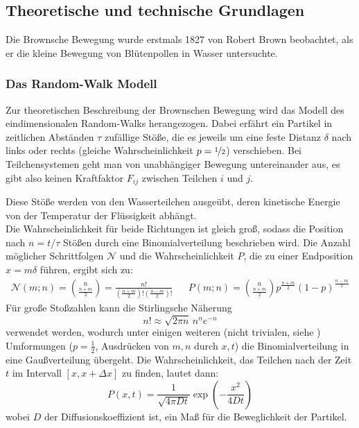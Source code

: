 \newpage

\subsection[Theoretische und technische Grundlagen]{Theoretische und technische Grundlagen \protect\autocite{Skript_2.1}}
Die Brownsche Bewegung wurde erstmals 1827 von Robert Brown beobachtet, als er die kleine Bewegung von Blütenpollen in Wasser untersuchte.

\subsubsection{Das Random-Walk Modell} \label{ssec:RndWalk}
Zur theoretischen Beschreibung der Brownschen Bewegung wird das Modell des eindimensionalen Random-Walks herangezogen. Dabei erfährt ein Partikel in zeitlichen Abständen \(\tau\) zufällige Stöße, die es jeweils um eine feste Distanz \(\delta\) nach links oder rechts (gleiche Wahrscheinlichkeit \(p=\nicefrac{1}{2}\)) verschieben. Bei Teilchensystemen geht man von unabhängiger Bewegung untereinander aus, es gibt also keinen Kraftfaktor \(F_{ij}\) zwischen Teilchen \(i\) und \(j\).

Diese Stöße werden von den Wasserteilchen ausgeübt, deren kinetische Energie von der Temperatur der Flüssigkeit abhängt. \\Die Wahrscheinlichkeit für beide Richtungen ist gleich groß, sodass die Position nach \(n = t/\tau\) Stößen durch eine Binomialverteilung beschrieben wird. Die Anzahl möglicher Schrittfolgen \(\mathcal{N}\) und die Wahrscheinlichkeit \(P\), die zu einer Endposition \(x = m \delta\) führen, ergibt sich zu:
\begin{align} \label{eq:binom}
   \mathcal{N}(m;n)=\binom{n}{\frac{n+m}{2}} = \frac{n!}{\left(\frac{n+m}{2}\right)!\left(\frac{n-m}{2}\right)!}&&P(m;n)= \binom{n}{\frac{n+m}{2}}p^{\frac{n+m}{2}}(1-p)^\frac{n-m}{2}   
\end{align}
Für große Stoßzahlen kann die Stirlingsche Näherung
\begin{equation} \label{eq:stirling}
    n! \approx \sqrt{2\pi n}\, n^{n} e^{-n}
\end{equation}
verwendet werden, wodurch unter einigen weiteren (nicht trivialen, siehe \autocite{Skript_2.1}) Umformungen (\(p=\frac{1}{2}\), Ausdrücken von \(m,n\) durch \(x,t\)) die Binomialverteilung in eine Gaußverteilung übergeht. Die Wahrscheinlichkeit, das Teilchen nach der Zeit \(t\) im Intervall \([x, x+\Delta x]\) zu finden, lautet dann:
\begin{equation} \label{eq:gauss1d}
    P(x,t) = \frac{1}{\sqrt{4\pi D t}} \exp\left(-\frac{x^{2}}{4Dt}\right)
\end{equation}
wobei \(D\) der Diffusionskoeffizient ist, ein Maß für die Beweglichkeit der Partikel.

